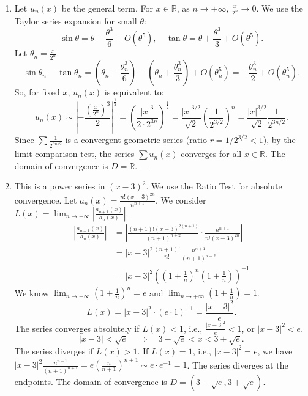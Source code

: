 \documentclass[12pt]{article}
\begin{document}
\begin{correctionbox}
\begin{enumerate}
    The series $\sum_{n>1} \frac{1}{(z-n)^2}$ is **absolutely convergent** on $D = \mathbb{C} \setminus \{n \in \mathbb{N} \mid n \geq 2\}$.
    ---
    \item 
    Let $u_n(x)$ be the general term.
    For $x \in \mathbb{R}$, as $n \to +\infty$, $\frac{x}{2^n} \to 0$. We use the Taylor series expansion for small $\theta$:
    $$\sin \theta = \theta - \frac{\theta^3}{6} + O(\theta^5), \quad \tan \theta = \theta + \frac{\theta^3}{3} + O(\theta^5).$$
    Let $\theta_n = \frac{x}{2^n}$.
    $$\sin \theta_n - \tan \theta_n = \left(\theta_n - \frac{\theta_n^3}{6}\right) - \left(\theta_n + \frac{\theta_n^3}{3}\right) + O(\theta_n^5) = -\frac{\theta_n^3}{2} + O(\theta_n^5).$$
    So, for fixed $x$, $u_n(x)$ is equivalent to:
    $$ u_n(x) \sim \left| - \frac{(\frac{x}{2^n})^3}{2} \right|^{\frac{1}{2}} = \left( \frac{|x|^3}{2 \cdot 2^{3n}} \right)^{\frac{1}{2}} = \frac{|x|^{3/2}}{\sqrt{2}} \left( \frac{1}{2^{3/2}} \right)^n = \frac{|x|^{3/2}}{\sqrt{2}} \frac{1}{2^{3n/2}}. $$
    Since $\sum \frac{1}{2^{3n/2}}$ is a convergent geometric series (ratio $r = 1/2^{3/2} < 1$), by the limit comparison test, the series $\sum u_n(x)$ converges for all $x \in \mathbb{R}$.
    The domain of convergence is $D = \mathbb{R}$.
    ---
    \item 
    This is a power series in $(x-3)^2$. We use the Ratio Test for absolute convergence.
    Let $a_n(x) = \frac{n!(x-3)^{2n}}{n^{n+1}}$. We consider $L(x) = \lim_{n \to +\infty} \left|\frac{a_{n+1}(x)}{a_n(x)}\right|$.
    \begin{align*} \label{eq:ratio}
    \left|\frac{a_{n+1}(x)}{a_n(x)}\right| &= \left| \frac{(n+1)!(x-3)^{2(n+1)}}{(n+1)^{n+2}} \cdot \frac{n^{n+1}}{n!(x-3)^{2n}} \right| \\
    &= |x-3|^2 \frac{(n+1)!}{n!} \frac{n^{n+1}}{(n+1)^{n+2}} \\
    &= |x-3|^2 \left(\left(1+\frac{1}{n}\right)^n \left(1+\frac{1}{n}\right)\right)^{-1}
    \end{align*}
    We know $\lim_{n \to +\infty} \left(1+\frac{1}{n}\right)^n = e$ and $\lim_{n \to +\infty} \left(1+\frac{1}{n}\right) = 1$.
    $$ L(x) = |x-3|^2 \cdot (e \cdot 1)^{-1} = \frac{|x-3|^2}{e}. $$
    The series converges absolutely if $L(x) < 1$, i.e., $\frac{|x-3|^2}{e} < 1$, or $|x-3|^2 < e$.
    $$ |x-3| < \sqrt{e} \quad \Rightarrow \quad 3 - \sqrt{e} < x < 3 + \sqrt{e}. $$
    The series diverges if $L(x) > 1$.
    If $L(x) = 1$, i.e., $|x-3|^2 = e$, we have $|x-3|^2 \frac{n^{n+1}}{(n+1)^{n+1}} = e \left(\frac{n}{n+1}\right)^{n+1} \sim e \cdot e^{-1} = 1$. The series diverges at the endpoints.
    The domain of convergence is $D = \left(3 - \sqrt{e}, 3 + \sqrt{e}\right)$.
\end{enumerate}
\end{correctionbox}
\end{document}
